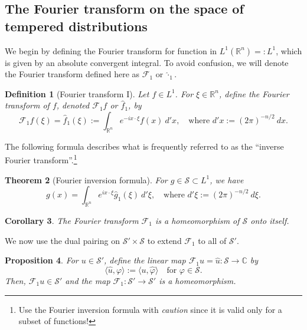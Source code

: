 \documentclass[12pt, letterpaper]{article}
\theoremstyle{plain}
\newtheorem{theorem}{Theorem}[section]
\newtheorem{corollary}[theorem]{Corollary}
\newtheorem{definition}[theorem]{Definition}
\newtheorem{proposition}[theorem]{Proposition}
\renewcommand{\phi}{\varphi}
\begin{document}
\subsection{The Fourier transform on the space of tempered distributions}

We begin by defining the Fourier transform for function in $L^1(\mathbb{R}^n) =: L^1$, which is given by an absolute convergent integral. To avoid confusion, we will denote the Fourier transform defined here as $\mathcal{F}_1$ or $\hat{\cdot}_1$. 

\begin{definition}[Fourier transform I]\label{F1}
    Let $f \in L^1$. For $\xi \in \mathbb{R}^n$, define the Fourier transform of $f$, denoted $\mathcal{F}_1f$ or $\hat{f}_1$, by
    \begin{equation}
        \mathcal{F}_1f(\xi) = \hat{f}_1(\xi) := \int_{\mathbb{R}^n} e^{-ix \cdot \xi} f(x) \ d'x, \quad \text{where } d'x := (2\pi)^{-n/2} \ dx.
    \end{equation}
\end{definition}

The following formula describes what is frequently referred to as the ``inverse Fourier transform''.\footnote{Use the Fourier inversion formula with \emph{caution} since it is valid only for a subset of functions!}

\begin{theorem}[Fourier inversion formula]
    For $g \in \mathcal{S} \subset L^1$, we have
    \begin{equation}
        g(x) = \int_{\mathbb{R}^n} e^{ix \cdot \xi} \hat{g}_1(\xi) \ d'\xi, \quad \text{where } d'\xi := (2\pi)^{-n/2} \ d\xi.
    \end{equation}
\end{theorem}

\begin{corollary}\label{homeo}
    The Fourier transform $\mathcal{F}_1$ is a homeomorphism of $\mathcal{S}$ onto itself.
\end{corollary}

We now use the dual pairing on $\mathcal{S}' \times \mathcal{S}$ to extend $\mathcal{F}_1$ to all of $\mathcal{S}'$.

\begin{proposition}
    For $u \in \mathcal{S}'$, define the linear map $\mathcal{F}_1u = \hat{u}: \mathcal{S} \to \mathbb{C}$ by
    \begin{equation}
        \langle \hat{u}, \phi \rangle := \langle u, \hat{\phi} \rangle \quad \text{for } \phi \in \mathcal{S}.
    \end{equation}
    Then, $\mathcal{F}_1u \in \mathcal{S}'$ and the map $\mathcal{F}_1: \mathcal{S}' \to \mathcal{S}'$ is a homeomorphism.
\end{proposition}
\end{document}

